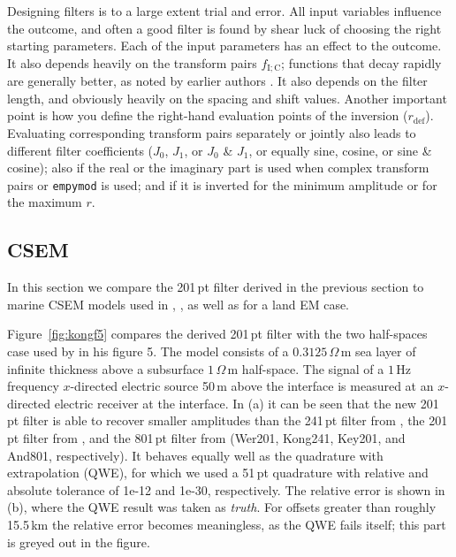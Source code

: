 \documentclass[paper,twocolumn,twoside]{geophysics}
\newcommand{\mr}[1]{\mathrm{#1}}
\begin{document}
Designing filters is to a large extent trial and error. All input variables
influence the outcome, and often  a good filter is found by shear luck of
choosing the right starting parameters. Each of the input parameters has an
effect to the outcome. It also depends heavily on the transform pairs
$f_\mr{I;C}$; functions that decay rapidly are generally better, as noted by
earlier authors \citep[e.g.][]{USGS.75.Anderson}. It also depends on the filter
length, and obviously heavily on the spacing and shift values. Another
important point is how you define the right-hand evaluation points of the
inversion ($r_\mr{def}$). Evaluating corresponding transform pairs separately
or jointly also leads to different filter coefficients ($J_0$, $J_1$, or $J_0$
\& $J_1$, or equally sine, cosine, or sine \& cosine); also if the real or the
imaginary part is used when complex transform pairs or \texttt{empymod} is
used; and if it is inverted for the minimum amplitude or for the maximum $r$.

\subsection{CSEM}
In this section we compare the 201\,pt filter derived in the previous section
to marine CSEM models used in \cite{GP.07.Kong}, \cite{GEO.12.Key}, as well as
for a land EM case.

Figure~\ref{fig:kongf5} compares the derived 201\,pt filter with the two
half-spaces case used by \cite{GP.07.Kong} in his figure 5. The model consists
of a $0.3125\,\Omega\,$m sea layer of infinite thickness above a subsurface
$1\,\Omega\,$m half-space. The signal of a $1\,$Hz frequency $x$-directed
electric source 50\,m above the interface is measured at an $x$-directed
electric receiver at the interface.
%
%
In (a) it can be seen that the new 201\,pt filter is able to recover smaller
amplitudes than the 241\,pt filter from \cite{GP.07.Kong}, the 201\,pt filter
from \cite{GEO.12.Key}, and the 801\,pt filter from \cite{TMS.82.Anderson}
(Wer201, Kong241, Key201, and And801, respectively). It behaves equally well as
the quadrature with extrapolation (QWE), for which we used a 51\,pt quadrature
with relative and absolute tolerance of 1e-12 and 1e-30, respectively. The
relative error is shown in (b), where the QWE result was taken as \emph{truth}.
For offsets greater than roughly 15.5\,km the relative error becomes
meaningless, as the QWE fails itself; this part is greyed out in the figure.
\end{document}
